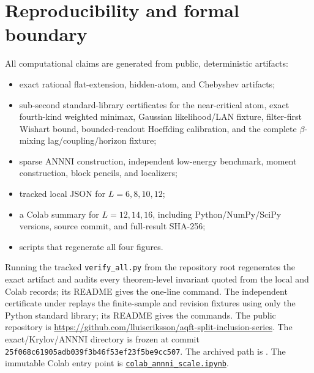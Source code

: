 \documentclass[11pt]{article}
\theoremstyle{definition}
\theoremstyle{remark}
\begin{document}
\section{Reproducibility and formal boundary}

All computational claims are generated from public, deterministic artifacts:
\begin{itemize}
  \item exact rational flat-extension, hidden-atom, and Chebyshev artifacts;
  \item sub-second standard-library certificates for the near-critical atom,
  exact fourth-kind weighted minimax, Gaussian likelihood/LAN fixture,
  filter-first Wishart
  bound, bounded-readout Hoeffding calibration, and the complete
  $\beta$-mixing lag/coupling/horizon fixture;
  \item sparse ANNNI construction, independent low-energy benchmark, moment
  construction, block pencils, and localizers;
  \item tracked local JSON for $L=6,8,10,12$;
  \item a Colab summary for $L=12,14,16$, including Python/NumPy/SciPy
  versions, source commit, and full-result SHA-256;
  \item scripts that regenerate all four figures.
\end{itemize}
Running the tracked \texttt{verify\_all.py} from the repository root
regenerates the exact artifact and audits every theorem-level invariant quoted
from the local and Colab records; its README gives the one-line command.
The independent certificate under
 replays the finite-sample and
revision fixtures using only the Python standard library; its README gives the
commands.
The public repository is
\url{https://github.com/lluiseriksson/aqft-split-inclusion-series}.
The exact/Krylov/ANNNI directory is frozen at commit
\nolinkurl{25f068c61905adb039f3b46f53ef23f5be9cc507}.  The archived path is
.  The immutable Colab entry
point is
\href{https://github.com/lluiseriksson/aqft-split-inclusion-series/blob/25f068c61905adb039f3b46f53ef23f5be9cc507/verification/finite_window_gap_certificates/colab_annni_scale.ipynb}
{\texttt{colab\_annni\_scale.ipynb}}.
\end{document}
